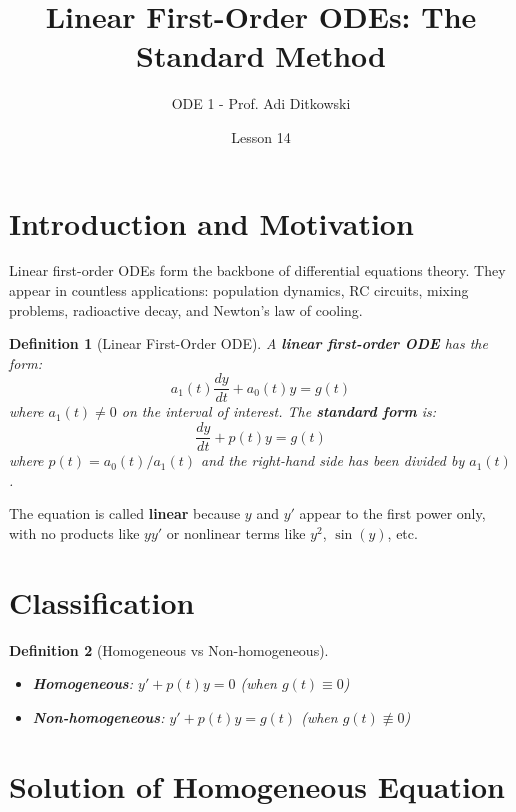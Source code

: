 \documentclass[12pt]{article}
\title{Linear First-Order ODEs: The Standard Method}
\author{ODE 1 - Prof. Adi Ditkowski}
\date{Lesson 14}
\newtheorem{definition}{Definition}
\begin{document}
\maketitle

\section{Introduction and Motivation}

Linear first-order ODEs form the backbone of differential equations theory. They appear in countless applications: population dynamics, RC circuits, mixing problems, radioactive decay, and Newton's law of cooling.

\begin{definition}[Linear First-Order ODE]
A \textbf{linear first-order ODE} has the form:
\begin{equation}
a_1(t)\frac{dy}{dt} + a_0(t)y = g(t)
\end{equation}
where $a_1(t) \neq 0$ on the interval of interest. The \textbf{standard form} is:
\begin{equation}
\frac{dy}{dt} + p(t)y = g(t)
\end{equation}
where $p(t) = a_0(t)/a_1(t)$ and the right-hand side has been divided by $a_1(t)$.
\end{definition}

\begin{keypoint}
The equation is called \textbf{linear} because $y$ and $y'$ appear to the first power only, with no products like $yy'$ or nonlinear terms like $y^2$, $\sin(y)$, etc.
\end{keypoint}

\section{Classification}

\begin{definition}[Homogeneous vs Non-homogeneous]
\begin{itemize}
\item \textbf{Homogeneous}: $y' + p(t)y = 0$ (when $g(t) \equiv 0$)
\item \textbf{Non-homogeneous}: $y' + p(t)y = g(t)$ (when $g(t) \not\equiv 0$)
\end{itemize}
\end{definition}

\section{Solution of Homogeneous Equation}
\end{document}
